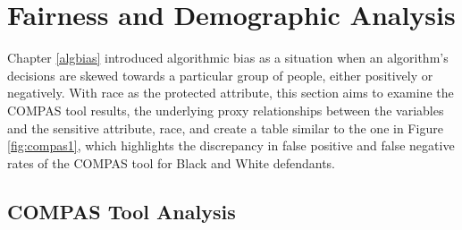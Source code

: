\documentclass[12pt, twoside]{amherstthesis}
\begin{document}
\hypertarget{fairnessanalysis}{%
\section{Fairness and Demographic Analysis}\label{fairnessanalysis}}

Chapter \ref{algbias} introduced algorithmic bias as a situation when an algorithm's decisions are skewed towards a particular group of people, either positively or negatively. With race as the protected attribute, this section aims to examine the COMPAS tool results, the underlying proxy relationships between the variables and the sensitive attribute, race, and create a table similar to the one in Figure \ref{fig:compas1}, which highlights the discrepancy in false positive and false negative rates of the COMPAS tool for Black and White defendants.

\hypertarget{comptoolanalysis}{%
\subsection{COMPAS Tool Analysis}\label{comptoolanalysis}}
\end{document}

